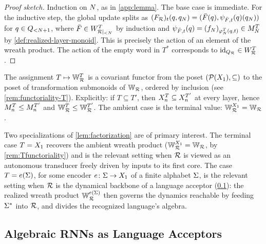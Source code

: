 \documentclass{article}
\begin{document}
\begin{proof}[Proof sketch]
Induction on $N$, as in \cref{app:lemma}. 
The base case is immediate. For the inductive step, the global update splits as 
$(F_{\mathcal{R}})_t(q, q_{N}) = (\bar{F}(q), \psi_{\bar{F}, t}(q)(q_{N}))$ for $q \in Q_{<N+1}$, 
where $\bar{F} \in W_{\mathcal{R}|_{<N}}^T$ by induction and
$\psi_{\bar{F},t}(q) = (f_N)_{\varphi_N^T(q,t)} \in M_N^T$ 
by \cref{def:realized-layer-monoid}. This is precisely the action of an element of the wreath product. The action of the empty word in $T^*$ corresponds to $\mathrm{id}_{Q_{\mathcal{R}}} \in W_{\mathcal{R}}^T$.
\end{proof}

\begin{remark}[Functoriality in $T$]\label{rem:Tfunctoriality}
The assignment $T \mapsto \mathbb{W}_{\mathcal{R}}^T$ is a covariant functor from the poset $(\mathcal{P}(X_1), \subseteq)$ to the poset of transformation submonoids of $\mathbb{W}_{\mathcal{R}}$, ordered by inclusion (see \cref{rem:functoriality-T}). 
Explicitly: if $T \subseteq T'$, then $X_n^T \subseteq X_n^{T'}$ at every layer, hence $M_n^T \leq M_n^{T'}$ and $\mathbb{W}_{\mathcal{R}}^T \leq \mathbb{W}_{\mathcal{R}}^{T'}$. The ambient case is the terminal value: $\mathbb{W}_{\mathcal{R}}^{X_1} = \mathbb{W}_{\mathcal{R}}$.
\end{remark}

Two specializations of \cref{lem:factorization} are of primary interest. 
The terminal case $T = X_1$ recovers the ambient wreath product ($\mathbb{W}_{\mathcal{R}}^{X_1} = \mathbb{W}_{\mathcal{R}}$, by \cref{rem:Tfunctoriality}) and is the relevant setting when $\mathcal{R}$ is viewed as an autonomous transducer freely driven by inputs to its first core. 
The case $T = e(\Sigma)$, for some encoder $e \colon \Sigma \to X_1$ of a finite alphabet $\Sigma$, is the relevant setting when $\mathcal{R}$ is the dynamical backbone of a language acceptor (\cref{sec:rnn-acceptors}): the realized wreath product $\mathbb{W}_{\mathcal{R}}^{e(\Sigma)}$ then governs the dynamics reachable by feeding $\Sigma^*$ into $\mathcal{R}$, and divides the recognized language's algebra.




\subsection{Algebraic RNNs as Language Acceptors}\label{sec:rnn-acceptors}
\end{document}
